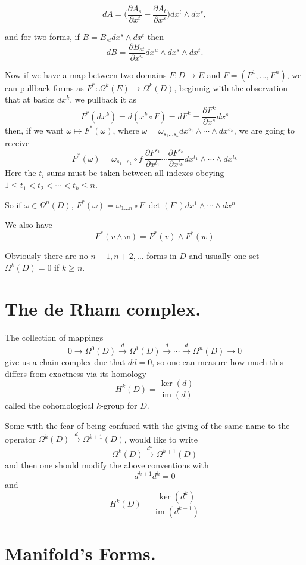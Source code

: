 \documentclass[12pt]{article}
\begin{document}
$$dA=\Big(\frac{\partial A_s}{\partial x^t}-\frac{\partial A_t}{\partial x^s}\Big)dx^t\wedge dx^s,$$

and for two forms, if $B=B_{st}dx^s\wedge dx^t$ then 
$$dB=\frac{\partial B_{st}}{\partial x^u}dx^u\wedge dx^s\wedge dx^t.$$

Now if we have a map between two domains $F\colon D\to E$ and $F=(F^1,...,F^n)$, we can pullback forms as $F^*\colon \Omega^k(E)\to \Omega^k(D)$, beginnig with the observation that at basics $dx^k$, we pullback it as 
$$F^*(dx^k)=d(x^k\circ F)=dF^k=\frac{\partial F^k}{\partial x^s}dx^s$$
then, if we want $\omega\mapsto F^*(\omega)$, 
where $\omega=\omega_{s_1...s_k}dx^{s_1}\wedge\cdots\wedge dx^{s_k}$, 
we are going to receive  
$$F^*(\omega)=\omega_{s_1...s_k}\circ f\ \frac{\partial F^{s_1}}{\partial x^{t_1}}\cdots\frac{\partial F^{s_k}}{\partial x^{t_k}}dx^{t_1}\wedge\cdots \wedge dx^{t_k}$$  
Here the $t_i$-sums 
must be taken between all indexes obeying $1\le t_1< t_2<\cdots < t_k\le n$.

So if $\omega\in\Omega^n(D)$, $F^*(\omega)=\omega_{1...n}\circ F\ \det(F')
dx^1\wedge\cdots\wedge dx^n$

We also have $$F^*(v\wedge w)=F^*(v)\wedge F^*(w)$$  


Obviously there are no $n+1, n+2,\ldots$ forms in $D$ and usually one set $\Omega^k(D)=0$ if $k\ge n$. 

\section{\bf The de Rham complex.}
The collection of mappings 
$$0\longrightarrow\Omega^0(D)\stackrel{d}\longrightarrow\Omega^1(D)\stackrel{d}
\longrightarrow\cdots\stackrel{d}\longrightarrow\Omega^n(D)\longrightarrow 0$$
give us a chain complex due that $dd=0$, so one can measure how much this differs from exactness via its homology
$$H^k(D)=\frac{\operatorname{ker}(d)}{\operatorname{im}(d)}$$
called the cohomological $k$-group for $D$.

Some
 with the fear of being confused with the giving of the same name to the operator $\Omega^k(D)\stackrel{d}\longrightarrow\Omega^{k+1}(D)$, would like to write
$$\Omega^k(D)\stackrel{d^k}\longrightarrow\Omega^{k+1}(D)$$ 
and then one should modify the above conventions with
$$d^{k+1}d^k=0$$
and 
$$H^k(D)=\frac{\operatorname{ker}(d^k)}{\operatorname{im}(d^{k-1})}$$


\section{\bf Manifold's Forms.}
\end{document}
